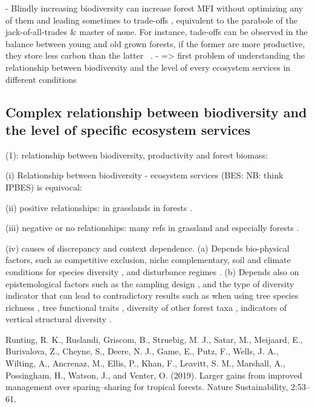 \documentclass{article}
\begin{document}
- Blindly increasing biodiversity can increase forest MFI without optimizing any of them and leading sometimes to trade-offs \citep{vanderplasJackofalltradesEffectsDrive2016}, equivalent to the parabole of the jack-of-all-trades \& master of none. For instance, tade-offs can be observed in the balance between young and old grown forests, if the former are more productive, they store less carbon than the latter ~\autocite{caspersenSuccessionalDiversityForest2001}. 
- => first problem of understanding the relationship between biodiversity and the level of every ecosystem services in different conditions

\subsection{Complex relationship between biodiversity and the level of specific ecosystem services}

(1): relationship between biodiversity, productivity and forest biomass: 

(i) Relationship between biodiversity - ecosystem services (BES: NB: think IPBES) is equivocal:

(ii) positive relationships: in grasslands \citep{tilmanBiodiversityPopulationEcosystem1996} in forests  \citep{liangPositiveBiodiversityproductivityRelationship2016, morinTreeSpeciesRichness2011,paquetteEffectBiodiversityTree2011,jourdanManagingMixedStands2021}.

(iii) negative or no relationships: many refs in grassland \citep{REFs} and especially forests  \citep{forresterReviewProcessesDiversity2016}.

(iv) causes of discrepancy and context dependence. (a) Depends bio-physical factors, such as competitive exclusion, niche complementary, soil and climate conditions for species diversity \citep{juckerClimateModulatesEffects2016, Pichancourt2014, Pichancourt2023}, and disturbance regimes \citep{Pichancourt2014, Pichancourt2023}. (b) Depends also on epistemological factors such as the sampling design \citep{aliBiodiversityEcosystemFunctioning2023}, and the type of diversity indicator that can lead to contradictory results such as when using tree species richness \citep{juckerClimateModulatesEffects2016}, tree functional traits \citep{Pichancourt2014, Pichancourt2023}, diversity of other forest taxa \citep{Runting2019}, indicators of vertical structural diversity \citep{guldinRoleUnevenAgedSilviculture1996, noletComparingEffectsEven2018}. 

Runting, R. K., Ruslandi, Griscom, B., Struebig, M. J., Satar, M., Meijaard, E., Burivalova, Z.,
Cheyne, S., Deere, N. J., Game, E., Putz, F., Wells, J. A., Wilting, A., Ancrenaz, M., Ellis,
P., Khan, F., Leavitt, S. M., Marshall, A., Possingham, H., Watson, J., and Venter, O. (2019).
Larger gains from improved management over sparing–sharing for tropical forests. Nature
Sustainability, 2:53–61.
\end{document}
